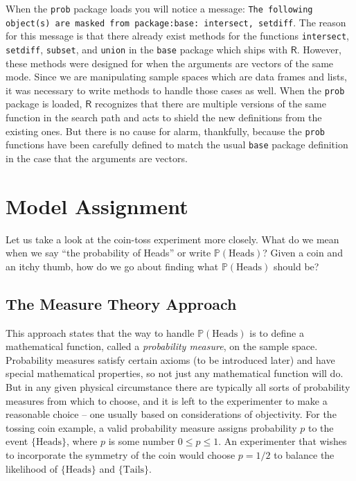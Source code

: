 \documentclass[captions=tableheading]{scrbook}
\begin{document}
\begin{note}

When the \texttt{prob} package loads you will notice a message: \texttt{The following object(s) are masked from package:base: intersect, setdiff}. The reason for this message is that there already exist methods for the functions \texttt{intersect}, \texttt{setdiff}, \texttt{subset}, and \texttt{union} in the \texttt{base} package which ships with \(\mathsf{R}\). However, these methods were designed for when the arguments are vectors of the same mode. Since we are manipulating sample spaces which are data frames and lists, it was necessary to write methods to handle those cases as well. When the \texttt{prob} package is loaded, \(\mathsf{R}\) recognizes that there are multiple versions of the same function in the search path and acts to shield the new definitions from the existing ones. But there is no cause for alarm, thankfully, because the \texttt{prob} functions have been carefully defined to match the usual \texttt{base} package definition in the case that the arguments are vectors. 

\end{note}
\section{Model Assignment}
\label{sec-4-3}
\label{sec-Interpreting-Probabilities}


Let us take a look at the coin-toss experiment more closely. What do we mean when we say ``the probability of Heads'' or write \(\mathbb{P}(\mbox{Heads})\)? Given a coin and an itchy thumb, how do we go about finding what \(\mathbb{P}(\mbox{Heads})\) should be?
\subsection{The Measure Theory Approach}
\label{sec-4-3-1}


This approach states that the way to handle \(\mathbb{P}(\mbox{Heads})\) is to define a mathematical function, called a \emph{probability measure}, on the sample space. Probability measures satisfy certain axioms (to be introduced later) and have special mathematical properties, so not just any mathematical function will do. But in any given physical circumstance there are typically all sorts of probability measures from which to choose, and it is left to the experimenter to make a reasonable choice -- one usually based on considerations of objectivity. For the tossing coin example, a valid probability measure assigns probability \(p\) to the event \( \{ \mbox{Heads} \} \), where \(p\) is some number \(0\leq p\leq1\). An experimenter that wishes to incorporate the symmetry of the coin would choose \(p=1/2\) to balance the likelihood of \( \{\mbox{Heads} \} \) and \( \{ \mbox{Tails} \} \).
\end{document}
